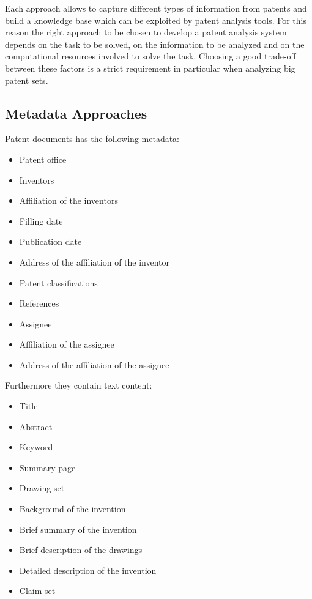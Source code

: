 \documentclass[b5paper,]{book}
\providecommand{\tightlist}{%
  \setlength{\itemsep}{0pt}\setlength{\parskip}{0pt}}
\theoremstyle{definition}
\theoremstyle{definition}
\theoremstyle{definition}
\theoremstyle{remark}
\begin{document}
Each approach allows to capture different types of information from
patents and build a knowledge base which can be exploited by patent
analysis tools. For this reason the right approach to be chosen to
develop a patent analysis system depends on the task to be solved, on
the information to be analyzed and on the computational resources
involved to solve the task. Choosing a good trade-off between these
factors is a strict requirement in particular when analyzing big patent
sets.

\subsection{Metadata Approaches}\label{metadata-approaches}

Patent documents has the following metadata:

\begin{itemize}
\tightlist
\item
  Patent office
\item
  Inventors
\item
  Affiliation of the inventors
\item
  Filling date
\item
  Publication date
\item
  Address of the affiliation of the inventor
\item
  Patent classifications
\item
  References
\item
  Assignee
\item
  Affiliation of the assignee
\item
  Address of the affiliation of the assignee
\end{itemize}

Furthermore they contain text content:

\begin{itemize}
\tightlist
\item
  Title
\item
  Abstract
\item
  Keyword
\item
  Summary page
\item
  Drawing set
\item
  Background of the invention
\item
  Brief summary of the invention
\item
  Brief description of the drawings
\item
  Detailed description of the invention
\item
  Claim set
\end{itemize}
\end{document}
